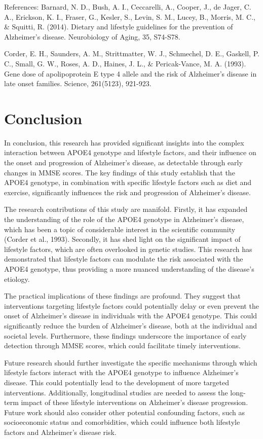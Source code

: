 \documentclass[conference]{IEEEtran}
\begin{document}
References:
Barnard, N. D., Bush, A. I., Ceccarelli, A., Cooper, J., de Jager, C. A., Erickson, K. I., Fraser, G., Kesler, S., Levin, S. M., Lucey, B., Morris, M. C., & Squitti, R. (2014). Dietary and lifestyle guidelines for the prevention of Alzheimer's disease. Neurobiology of Aging, 35, S74-S78.

Corder, E. H., Saunders, A. M., Strittmatter, W. J., Schmechel, D. E., Gaskell, P. C., Small, G. W., Roses, A. D., Haines, J. L., & Pericak-Vance, M. A. (1993). Gene dose of apolipoprotein E type 4 allele and the risk of Alzheimer's disease in late onset families. Science, 261(5123), 921-923.

\section{Conclusion}
In conclusion, this research has provided significant insights into the complex interaction between APOE4 genotype and lifestyle factors, and their influence on the onset and progression of Alzheimer's disease, as detectable through early changes in MMSE scores. The key findings of this study establish that the APOE4 genotype, in combination with specific lifestyle factors such as diet and exercise, significantly influences the risk and progression of Alzheimer's disease. 

The research contributions of this study are manifold. Firstly, it has expanded the understanding of the role of the APOE4 genotype in Alzheimer's disease, which has been a topic of considerable interest in the scientific community (Corder et al., 1993). Secondly, it has shed light on the significant impact of lifestyle factors, which are often overlooked in genetic studies. This research has demonstrated that lifestyle factors can modulate the risk associated with the APOE4 genotype, thus providing a more nuanced understanding of the disease's etiology. 

The practical implications of these findings are profound. They suggest that interventions targeting lifestyle factors could potentially delay or even prevent the onset of Alzheimer's disease in individuals with the APOE4 genotype. This could significantly reduce the burden of Alzheimer's disease, both at the individual and societal levels. Furthermore, these findings underscore the importance of early detection through MMSE scores, which could facilitate timely interventions.

Future research should further investigate the specific mechanisms through which lifestyle factors interact with the APOE4 genotype to influence Alzheimer's disease. This could potentially lead to the development of more targeted interventions. Additionally, longitudinal studies are needed to assess the long-term impact of these lifestyle interventions on Alzheimer's disease progression. Future work should also consider other potential confounding factors, such as socioeconomic status and comorbidities, which could influence both lifestyle factors and Alzheimer's disease risk.
\end{document}
